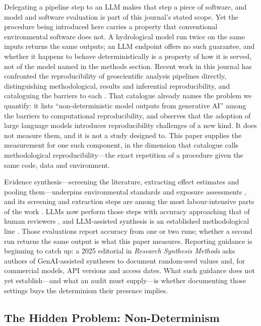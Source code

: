 \documentclass[preprint,review,12pt,authoryear]{elsarticle}
\begin{document}
Delegating a pipeline step to an LLM makes that step a piece of software, and model and software evaluation is part of this journal's stated scope. Yet the procedure being introduced here carries a property that conventional environmental software does not. A hydrological model run twice on the same inputs returns the same outputs; an LLM endpoint offers no such guarantee, and whether it happens to behave deterministically is a property of how it is served, not of the model named in the methods section. Recent work in this journal has confronted the reproducibility of geoscientific analysis pipelines directly, distinguishing methodological, results and inferential reproducibility, and cataloguing the barriers to each \citep{schlogl2026reproducibility}. That catalogue already names the problem we quantify: it lists ``non-deterministic model outputs from generative AI'' among the barriers to computational reproducibility, and observes that the adoption of large language models introduces reproducibility challenges of a new kind. It does not measure them, and it is not a study designed to. This paper supplies the measurement for one such component, in the dimension that catalogue calls methodological reproducibility---the exact repetition of a procedure given the same code, data and environment.

Evidence synthesis---screening the literature, extracting effect estimates and pooling them---underpins environmental standards and exposure assessments \citep{higgins2019cochrane,page2021prisma}, and its screening and extraction steps are among the most labour-intensive parts of the work \citep{borah2017analysis}.
LLMs now perform those steps with accuracy approaching that of human reviewers \citep{oami2024screening,gartlehner2024extraction,jensen2025chatgpt}, and LLM-assisted synthesis is an established methodological line \citep{li2025jamia,scherbakov2025jamia,matsui2024screening,oami2025optimal}.
Those evaluations report accuracy from one or two runs; whether a second run returns the same output is what this paper measures.
Reporting guidance is beginning to catch up: a 2025 editorial in \emph{Research Synthesis Methods} \citep{farotimi2025rsm_genai_guidance} asks authors of GenAI-assisted syntheses to document random-seed values and, for commercial models, API versions and access dates. What such guidance does not yet establish---and what an audit must supply---is whether documenting those settings buys the determinism their presence implies.

\subsection{The Hidden Problem: Non-Determinism}
\end{document}
